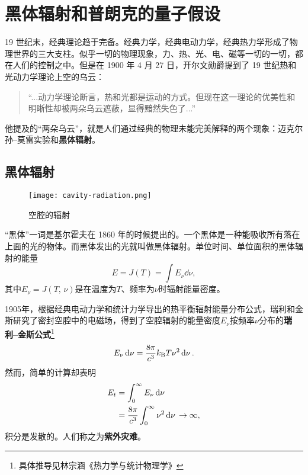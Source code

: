 
\section{黑体辐射和普朗克的量子假设}
19 世纪末，经典理论趋于完备。经典力学，经典电动力学，经典热力学形成了物理世界的三大支柱。似乎一切的物理现象，力、热、光、电、磁等一切的一切，都在人们的控制之中。但是在 1900 年 4 月 27 日，开尔文勋爵提到了 19 世纪热和光动力学理论上空的乌云：
\begin{quote}\kaishu
	“...动力学理论断言，热和光都是运动的方式。但现在这一理论的优美性和明晰性却被两朵乌云遮蔽，显得黯然失色了...”
\end{quote}
他提及的“两朵乌云”，就是人们通过经典的物理未能完美解释的两个现象：迈克尔孙--莫雷实验和\textbf{黑体辐射}。

\subsection{黑体辐射}
\begin{figure}[H]
    \centering
    \texttt{[image: cavity-radiation.png]}
    \caption{空腔的辐射}
\end{figure}
“黑体”一词是基尔霍夫在 1860 年的时候提出的。一个黑体是一种能吸收所有落在上面的光的物体。而黑体发出的光就叫做黑体辐射。单位时间、单位面积的黑体辐射的能量
\begin{equation}
	E=J(T)=\int E_\nu\dd{\nu},
\end{equation}
其中$E_\nu=J(T,\,\nu)$是在温度为$T$、频率为$\nu$时辐射能量密度。

1905年，根据经典电动力学和统计力学导出的热平衡辐射能量分布公式，瑞利和金斯研究了密封空腔中的电磁场，得到了空腔辐射的能量密度$E_\nu$按频率$\nu$分布的\textbf{瑞利--金斯公式}\footnote{具体推导见林宗涵《热力学与统计物理学》}
\begin{equation}
	E_\nu\dd{\nu} =\frac{8\mathrm{\pi}}{c^3}k_{\mathrm{B}} T\nu^2\dd{\nu}.
\end{equation}
然而，简单的计算却表明
\begin{align}
	E_t
	&=\int^{\infty}_{0} E_\nu \dd{\nu} \notag\\
	&=\frac{8\mathrm{\pi}}{c^3}\int^{\infty}_{0}\nu^2\dd{\nu}\, \to \infty,
\end{align}
积分是发散的。人们称之为\textbf{紫外灾难}。

